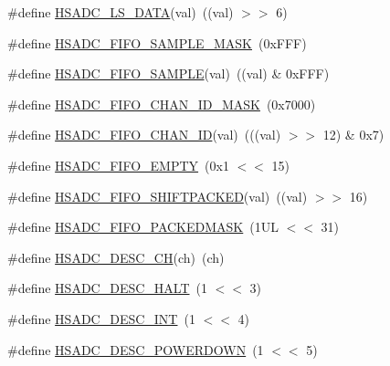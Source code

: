 \begin{DoxyCompactItemize}
\item 
\#define \hyperlink{group___h_s_a_d_c__18_x_x__43_x_x_ga59cfae9793b32fc984aa56b25e579e85}{H\+S\+A\+D\+C\+\_\+\+L\+S\+\_\+\+D\+A\+TA}(val)~((val) $>$$>$ 6)
\item 
\#define \hyperlink{group___h_s_a_d_c__18_x_x__43_x_x_ga5ae1350581db3acfa2450f482f64a14d}{H\+S\+A\+D\+C\+\_\+\+F\+I\+F\+O\+\_\+\+S\+A\+M\+P\+L\+E\+\_\+\+M\+A\+SK}~(0x\+F\+F\+F)
\item 
\#define \hyperlink{group___h_s_a_d_c__18_x_x__43_x_x_ga4e9d547e690f73b5e1cef272e5272239}{H\+S\+A\+D\+C\+\_\+\+F\+I\+F\+O\+\_\+\+S\+A\+M\+P\+LE}(val)~((val) \& 0x\+F\+F\+F)
\item 
\#define \hyperlink{group___h_s_a_d_c__18_x_x__43_x_x_ga46dfa5dab0fc08a4e9126be14eec1f1c}{H\+S\+A\+D\+C\+\_\+\+F\+I\+F\+O\+\_\+\+C\+H\+A\+N\+\_\+\+I\+D\+\_\+\+M\+A\+SK}~(0x7000)
\item 
\#define \hyperlink{group___h_s_a_d_c__18_x_x__43_x_x_gaa90d96f985440d9588a1b0a3d3b30d9e}{H\+S\+A\+D\+C\+\_\+\+F\+I\+F\+O\+\_\+\+C\+H\+A\+N\+\_\+\+ID}(val)~(((val) $>$$>$ 12) \& 0x7)
\item 
\#define \hyperlink{group___h_s_a_d_c__18_x_x__43_x_x_ga024359046ed5aea283f5ca303828ebaf}{H\+S\+A\+D\+C\+\_\+\+F\+I\+F\+O\+\_\+\+E\+M\+P\+TY}~(0x1 $<$$<$ 15)
\item 
\#define \hyperlink{group___h_s_a_d_c__18_x_x__43_x_x_ga59b2c13550ce54537ddba69cec51bd0b}{H\+S\+A\+D\+C\+\_\+\+F\+I\+F\+O\+\_\+\+S\+H\+I\+F\+T\+P\+A\+C\+K\+ED}(val)~((val) $>$$>$ 16)
\item 
\#define \hyperlink{group___h_s_a_d_c__18_x_x__43_x_x_ga135c335cef689d7ecc14af1f5bd0ac6b}{H\+S\+A\+D\+C\+\_\+\+F\+I\+F\+O\+\_\+\+P\+A\+C\+K\+E\+D\+M\+A\+SK}~(1\+U\+L $<$$<$ 31)
\item 
\#define \hyperlink{group___h_s_a_d_c__18_x_x__43_x_x_ga02a0ec797250b260c4ffa4e52e256a44}{H\+S\+A\+D\+C\+\_\+\+D\+E\+S\+C\+\_\+\+CH}(ch)~(ch)
\item 
\#define \hyperlink{group___h_s_a_d_c__18_x_x__43_x_x_gaba66d1c1c7ce5508696f9da464b680c9}{H\+S\+A\+D\+C\+\_\+\+D\+E\+S\+C\+\_\+\+H\+A\+LT}~(1 $<$$<$ 3)
\item 
\#define \hyperlink{group___h_s_a_d_c__18_x_x__43_x_x_gade13fb1864987d1b1d8054ae6f861167}{H\+S\+A\+D\+C\+\_\+\+D\+E\+S\+C\+\_\+\+I\+NT}~(1 $<$$<$ 4)
\item 
\#define \hyperlink{group___h_s_a_d_c__18_x_x__43_x_x_ga5cb818c7f3deae6a0bd626acde3f4278}{H\+S\+A\+D\+C\+\_\+\+D\+E\+S\+C\+\_\+\+P\+O\+W\+E\+R\+D\+O\+WN}~(1 $<$$<$ 5)
\item 

\end{DoxyCompactItemize}
